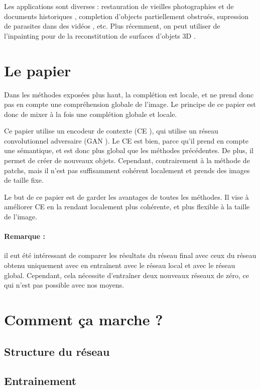 \documentclass[12pt]{article}
\begin{document}
Les applications sont diverses : restauration de vieilles photographies et de documents historiques \cite{bertalmio2000}, completion d'objects partiellement obstrués, supression de parasites dans des vidéos \cite{wexler2007}, etc. Plus récemment, on peut utiliser de l'inpainting pour de la reconstitution de surfaces d'objets 3D \cite{bobenko2005} \cite{harary2014}.

\section{Le papier}

Dans les méthodes exposées plus haut, la complétion est locale, et ne prend donc pas en compte une compréhension globale de l'image. Le principe de ce papier est donc de mixer à la fois une complétion globale et locale.

Ce papier utilise un encodeur de contexte (CE \cite{pathak2016}), qui utilise un réseau convolutionnel adversaire (GAN \cite{goodfellow2014}). Le CE est bien, parce qu'il prend en compte une sémantique, et est donc plus global que les méthodes précédentes. De plus, il permet de créer de nouveaux objets. Cependant, contrairement à la méthode de patchs, mais il n'est pas suffisamment cohérent localement et prends des images de taille fixe.

Le but de ce papier est de garder les avantages de toutes les méthodes. Il vise à améliorer CE en la rendant localement plus cohérente, et plus flexible à la taille de l'image.


\paragraph{Remarque :} il eut été intéressant de comparer les résultats du réseau final avec ceux du réseau obtenu uniquement avec en entraînent avec le réseau local et avec le réseau global. Cependant, cela nécessite d'entraîner deux nouveaux réseaux de zéro, ce qui n'est pas possible avec nos moyens.

\section{Comment ça marche ?}

\subsection{Structure du réseau}
\subsection{Entrainement}
\end{document}
